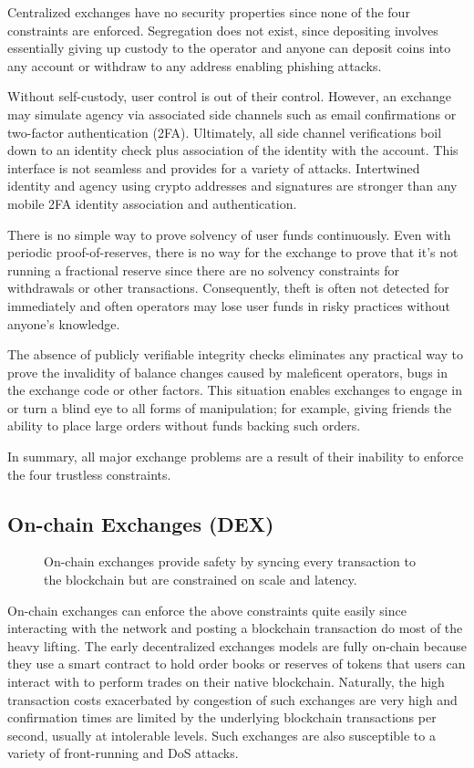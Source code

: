 \documentclass[12pt,a4paper]{article}
\begin{document}
Centralized exchanges have no security properties since none of the four constraints are enforced. Segregation does not exist, since depositing involves essentially giving up custody to the operator and anyone can deposit coins into any account or withdraw to any address enabling phishing attacks.

Without self-custody, user control is out of their control. However, an exchange may simulate agency via associated side channels such as email confirmations or two-factor authentication (2FA). Ultimately, all side channel verifications boil down to an identity check plus association of the identity with the account. This interface is not seamless and provides for a variety of attacks. Intertwined identity and agency using crypto addresses and signatures are stronger than any mobile 2FA identity association and authentication\cite{DLRS14}.

There is no simple way to prove solvency of user funds continuously. Even with periodic proof-of-reserves, there is no way for the exchange to prove that it’s not running a fractional reserve since there are no solvency constraints for withdrawals or other transactions. Consequently, theft is often not detected for immediately and often operators may lose user funds in risky practices without anyone’s knowledge.

The absence of publicly verifiable integrity checks eliminates any practical way to prove the invalidity of balance changes caused by maleficent operators, bugs in the exchange code or other factors. This situation enables exchanges to engage in or turn a blind eye to all forms of manipulation; for example, giving friends the ability to place large orders without funds backing such orders.

In summary, all major exchange problems are a result of their inability to enforce the four trustless constraints.

\subsection{On-chain Exchanges (DEX)}
\begin{figure}[ht]
\begin{center}

\end{center}
\caption{On-chain exchanges provide safety by syncing every transaction to the blockchain but are constrained on scale and latency. }
\end{figure}
On-chain exchanges can enforce the above constraints quite easily since interacting with the network and posting a blockchain transaction do most of the heavy lifting. The early decentralized exchanges models are fully on-chain because they use a smart contract to hold order books or reserves of tokens that users can interact with to perform trades on their native blockchain. Naturally, the high transaction costs exacerbated by congestion of such exchanges are very high and confirmation times are limited by the underlying blockchain transactions per second, usually at intolerable levels. Such exchanges are also susceptible to a variety of front-running and DoS attacks\cite{levprotocol}.
\end{document}
